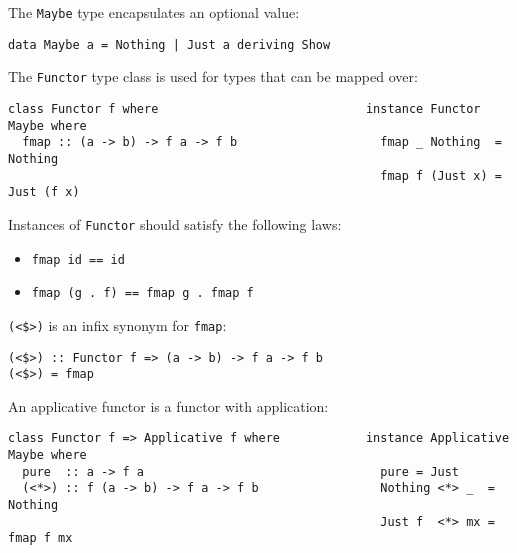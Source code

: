 \documentclass[a4paper,10pt,addpoints]{exam}
\begin{document}
\begin{center}
\end{center}

\vspace{0.1in}


\vspace{0.2in}

The \texttt{Maybe} type encapsulates an optional value:

\begin{verbatim}
data Maybe a = Nothing | Just a deriving Show
\end{verbatim}

The \texttt{Functor} type class is used for types that can be mapped
over:

\begin{verbatim}
class Functor f where                             instance Functor Maybe where
  fmap :: (a -> b) -> f a -> f b                    fmap _ Nothing  = Nothing
                                                    fmap f (Just x) = Just (f x)
\end{verbatim}

Instances of \texttt{Functor} should satisfy the following laws:

\begin{itemize}
\item
  \texttt{fmap id == id}
\item
  \texttt{fmap (g .\ f) == fmap g .\ fmap f}
\end{itemize}

\texttt{(<\$>)} is an infix synonym for \texttt{fmap}:

\begin{verbatim}
(<$>) :: Functor f => (a -> b) -> f a -> f b
(<$>) = fmap
\end{verbatim}

An applicative functor is a functor with application:

\begin{verbatim}
class Functor f => Applicative f where            instance Applicative Maybe where
  pure  :: a -> f a                                 pure = Just
  (<*>) :: f (a -> b) -> f a -> f b                 Nothing <*> _  = Nothing
                                                    Just f  <*> mx = fmap f mx
\end{verbatim}
\end{document}

